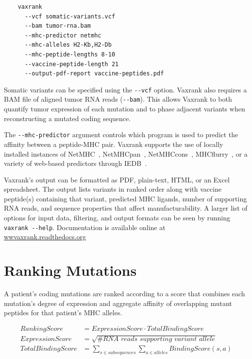 \documentclass[10pt,letterpaper]{article}
\begin{document}
\vspace{1ex}
\begin{verbatim}
    vaxrank
      --vcf somatic-variants.vcf
      --bam tumor-rna.bam
      --mhc-predictor netmhc
      --mhc-alleles H2-Kb,H2-Db
      --mhc-peptide-lengths 8-10
      --vaccine-peptide-length 21
      --output-pdf-report vaccine-peptides.pdf
\end{verbatim}
\vspace{1ex}

Somatic variants can be specified using the \verb|--vcf| option. Vaxrank also requires a BAM file of aligned tumor RNA reads (\verb|--bam|). This allows Vaxrank to both quantify tumor expression of each mutation and to phase adjacent variants when reconstructing a mutated coding sequence.

The \verb|--mhc-predictor| argument controls which program is used to predict the affinity between a peptide-MHC pair. Vaxrank supports the use of locally installed instances of NetMHC~\citep{netmhc2016}, NetMHCpan~\citep{netmhcpan2007}, NetMHCcons~\citep{netmhccons}, MHCflurry~\citep{mhcflurry}, or a variety of web-based predictors through IEDB~\citep{iedb}.

Vaxrank's output can be formatted as PDF, plain-text, HTML, or an Excel spreadsheet. The output lists variants in ranked order along with vaccine peptide(s) containing that variant, predicted MHC ligands, number of supporting RNA reads, and sequence properties that affect manufacturability. A larger list of options for input data, filtering, and output formats can be seen by running \verb|vaxrank --help|. Documentation is available online at \href{http://vaxrank.readthedocs.io}{wwvaxrank.readthedocs.org}

\section{Ranking Mutations}
A patient's coding mutations are ranked according to a score that combines each mutation's degree of expression and aggregate affinity of overlapping mutant peptides for that patient's MHC alleles.

\begin{align*}
\textit{RankingScore}       &= \textit{ExpressionScore} \cdot \textit{TotalBindingScore} \\
\textit{ExpressionScore}    &= \sqrt{\textit{\# RNA reads supporting variant allele}} \\
\textit{TotalBindingScore}      &= \sum_{s \in \textit{subsequences}}\sum_{a \in \textit{alleles}}\textit{BindingScore}(s, a)
\end{align*}
\end{document}
